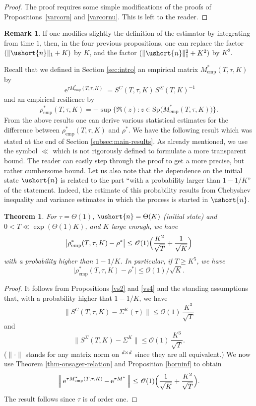 \documentclass[11pt]{article}
\makeatletter
\newcommand{\emp}{\mathrm{emp}}
\newcommand{\scaleto}[2]{#1}
\DeclareRobustCommand{\mathds}[1]{\csname jepbb@#1\endcsname}
\let\mathcal\mathscr
\numberwithin{equation}{section}
\theoremstyle{plain}
\newtheorem{theorem}{Theorem}[section]
\theoremstyle{definition}
\newtheorem{remark}{Remark}[section]
\newcommand{\Oun}{\mathcal{O}(1)}
\newcommand{\Thetaun}{\Theta(1)}
\newcommand{\sK}{K}
\newcommand{\Sp}{\mathrm{Sp}}
\newcommand{\vecn}{\ushort{n}}
\newcommand{\res}{\rho^*}
\newcommand{\e}{\operatorname{e}}
\newcommand{\norm}[1]{\|#1\|_{1}}\let\snorm\norm
\makeatother
\begin{document}
\begin{proof}
The proof requires some simple modifications of the proofs of Propositions~\ref{varcorn} and \ref{varcornu}. This is left to the reader.
\end{proof}

\begin{remark}
If one modifies slightly the definition of the estimator by integrating from time $1$,
then, in the four previous propositions, one can replace the factor \hbox{$(\norm{\vecn}+K)$} by $K$, and the factor
$(\norm{\vecn}^{2}+K^2)$ by $K^2$.
\end{remark}

Recall that we defined in Section \ref{sec:intro} an empirical matrix $M^{*}_\emp(T,\tau,K)$ by
\[
\e^{\tau M^{*}_\emp(T,\tau,K)}=S^{C}(T,\tau,K)\,S^{\Sigma}(T,K)^{-1}
\]
and an empirical resilience by
\[
\rho^*_\emp(T,\tau,K)=- \sup\{ \Re (z): z\in\Sp\bigl(M^{*}_\emp(T,\tau,K)\bigr)\}.
\]
From the above results one can derive various statistical estimates for the difference between $\rho^*_\emp(T,\tau,K)$
and $\res$. We have the following result which was stated at the end of Section \ref{subsec:main-results}. As already mentioned, we
use the symbol $\ll$ which is not rigorously defined to formulate a more transparent bound.
The reader can easily step through the proof to get a more precise, but rather cumbersome bound.
Let us also note that the dependence on the initial state $\vecn$ is related to the part ``with a probability larger than
$1-1/K$'' of the statement. Indeed, the estimate of this probability results from Chebyshev inequality and variance estimates in which the process is
started in $\vecn$.

\begin{theorem}\label{rhoemp}
For $\tau=\Theta(1)$, $\vecn=\Theta(K)$ (initial state) and $0<T\ll \exp(\Thetaun K)$,
and $K$ large enough, we have
\[
\big|\rho^*_\emp(T,\tau,K)-\res\big|\le
\Oun \Bigl(\frac{K^{2}}{\sqrt{T}} +\frac{1}{\sqrt{K}} \Bigr)
\]
with a probability higher than $1-1/K$.
In particular, if $T\geq K^{\scaleto{5}{4.5pt}} $, we have
\[
\big|\rho^*_\emp(T,\tau,K)-\res\big|\leq \Oun/\sqrt{K}.
\]
\end{theorem}

\begin{proof}
It follows from Propositions \ref{vs2} and \ref{vs4} and the standing assumptions that, with a probability higher that $1-1/K$, we have
\[
\|S^{C}(T,\tau,K)-\Sigma^{\sK}(\tau)\|\leq \Oun\, \frac{K^{\scaleto{3}{4pt}}}{\sqrt{T}}
\]
and
\[
\|S^{{ \Sigma}}(T,K)-\Sigma^{\sK}\|\leq \Oun \, \frac{K^{\scaleto{3}{4.5pt}}}{\sqrt{T}}.
\]
($\|\cdot\|$ stands for any matrix norm on $\mathds{R}^{d\times d}$ since they are all equivalent.)
We now use Theorem \ref{thm-onsager-relation} and Proposition \ref{borninf} to obtain
\[
\Big\| \e^{\tau M^{*}_\emp(T,\tau,K)}-\e^{\tau M^{*}}\Big\|\leq \Oun \Bigl(\frac{1}{\sqrt{K}}+ \frac{K^2}{\sqrt{T}} \Bigr).
\]
The result follows since $\tau$ is of order one.
\end{proof}
\end{document}
